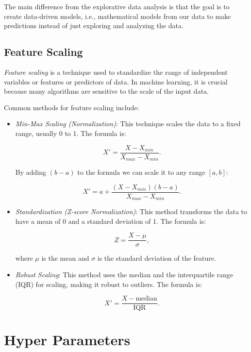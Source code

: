 The main difference from the explorative data analysis is that the goal is to create data-driven models, i.e., mathematical models
from our data to make predictions instead of just exploring and analyzing the data.

\subsection{Feature Scaling}

\emph{Feature scaling} is a technique used to standardize the range of independent variables or features or predictors of data.
In machine learning, it is crucial because many algorithms are sensitive to the scale of the input data.

Common methods for feature scaling include:

\begin{itemize}

	\item \emph{Min-Max Scaling (Normalization)}: This technique scales the data to a fixed range, usually 0 to 1. The formula is:

	      \[
		      X' = \frac{X - X_{min}}{X_{max} - X_{min}}.
	      \]

	      By adding \((b - a)\) to the formula we can scale it to any range \([a, b]\):

	      \[
		      X' = a + \frac{(X - X_{min})(b - a)}{X_{max} - X_{min}}.
	      \]

	\item \emph{Standardization (Z-score Normalization)}: This method transforms the data to have a mean of 0 and a standard deviation of 1. The formula is:

	      \[
		      Z = \frac{X - \mu}{\sigma},
	      \]

	      where \(\mu\) is the mean and \(\sigma\) is the standard deviation of the feature.

	\item \emph{Robust Scaling}: This method uses the median and the interquartile range (IQR) for scaling, making it robust to outliers. The formula is:

	      \[
		      X' = \frac{X - \text{median}}{\text{IQR}}.
	      \]

\end{itemize}

\section{Hyper Parameters}

